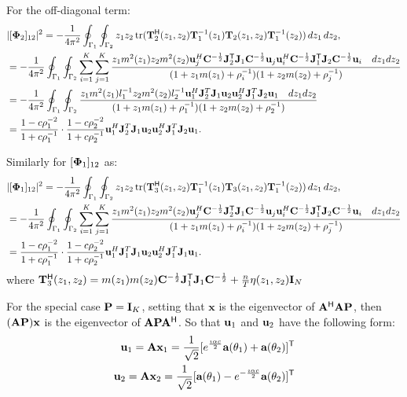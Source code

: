 \documentclass[11pt,a4paper]{article}
\begin{document}
For the off-diagonal term:
\begin{align*}
    &|[{\boldsymbol{\Phi}}_2]_{12}|^2 = -\frac1{4 \pi^2} \oint_{\Gamma_1} \oint_{\Gamma_2} z_1 z_2 \operatorname{tr} ( \mathbf{T}_2^{\sf H}(z_1,z_2) \mathbf{T}_1^{-1}(z_1) \mathbf{T}_2(z_1,z_2) \mathbf{T}_1^{-1}(z_2) )\,dz_1\,dz_2, \\ 
    &= -\frac1{4 \pi^2} \oint_{\Gamma_1} \oint_{\Gamma_2} \sum_{i=1}^K \sum_{j=1}^K \frac{z_1 m^2(z_1) z_2 m^2(z_2) \mathbf{u}_j^H {\mathbf{C}}^{-\frac{1}{2}}{\mathbf{J}}^{\sf T}_2{\mathbf{J}}_1{\mathbf{C}}^{-\frac{1}{2}} \mathbf{u}_j \mathbf{u}_i^H {\mathbf{C}}^{-\frac{1}{2}}{\mathbf{J}}^{\sf T}_1{\mathbf{J}}_2{\mathbf{C}}^{-\frac{1}{2}} \mathbf{u}_i \quad dz_1 dz_2 }{(1+z_1m(z_1)+\rho_i^{-1})(1+z_2m(z_2)+\rho_j^{-1})} \\
    &= -\frac1{4 \pi^2} \oint_{\Gamma_1} \oint_{\Gamma_2} \frac{z_1 m^2(z_1) l_1^{-1} z_2 m^2(z_2) l_2^{-1}  \mathbf{u}_1^H {\mathbf{J}}_2^T {\mathbf{J}}_1 \mathbf{u}_2 \mathbf{u}_2^H {\mathbf{J}}_1^T {\mathbf{J}}_2 \mathbf{u}_1 \quad dz_1 dz_2}{(1+z_1m(z_1)+\rho_1^{-1})(1+z_2m(z_2)+\rho_2^{-1})} \\
    &= \frac{1- c \rho_1^{-2}}{ 1 + c \rho_1^{-1} } \cdot \frac{1- c \rho_2^{-2}}{ 1 + c \rho_2^{-1} }  \mathbf{u}_1^H {\mathbf{J}}_2^T {\mathbf{J}}_1 \mathbf{u}_2 \mathbf{u}_2^H {\mathbf{J}}_1^T {\mathbf{J}}_2 \mathbf{u}_1.
\end{align*}

Similarly for $[{\boldsymbol{\Phi}}_1]_{12}$ as:
\begin{align*}
    &|[{\boldsymbol{\Phi}}_1]_{12}|^2 = -\frac1{4 \pi^2} \oint_{\Gamma_1} \oint_{\Gamma_2} z_1 z_2 \operatorname{tr} ( \mathbf{T}_3^{\sf H}(z_1,z_2) \mathbf{T}_1^{-1}(z_1) \mathbf{T}_3(z_1,z_2) \mathbf{T}_1^{-1}(z_2) )\,dz_1\,dz_2, \\ 
    &= -\frac1{4 \pi^2} \oint_{\Gamma_1} \oint_{\Gamma_2} \sum_{i=1}^K \sum_{j=1}^K \frac{z_1 m^2(z_1) z_2 m^2(z_2) \mathbf{u}_j^H {\mathbf{C}}^{-\frac{1}{2}}{\mathbf{J}}^{\sf T}_2{\mathbf{J}}_1{\mathbf{C}}^{-\frac{1}{2}} \mathbf{u}_j \mathbf{u}_i^H {\mathbf{C}}^{-\frac{1}{2}}{\mathbf{J}}^{\sf T}_1{\mathbf{J}}_2{\mathbf{C}}^{-\frac{1}{2}} \mathbf{u}_i \quad dz_1 dz_2 }{(1+z_1m(z_1)+\rho_i^{-1})(1+z_2m(z_2)+\rho_j^{-1})} \\
    &= \frac{1- c \rho_1^{-2}}{ 1 + c \rho_1^{-1} } \cdot \frac{1- c \rho_2^{-2}}{ 1 + c \rho_2^{-1} }  \mathbf{u}_1^H {\mathbf{J}}_1^T {\mathbf{J}}_1 \mathbf{u}_2 \mathbf{u}_2^H {\mathbf{J}}_1^T {\mathbf{J}}_1 \mathbf{u}_1.
\end{align*}
where $\mathbf{T}_3^{\sf H}(z_1,z_2) = m(z_1)m(z_2){\mathbf{C}}^{-\frac{1}{2}}{\mathbf{J}}^{\sf T}_1{\mathbf{J}}_1{\mathbf{C}}^{-\frac{1}{2}}+\frac{n}{T}\eta(z_1,z_2)\mathbf{I}_N$

For the special case ${\mathbf{P}}=\mathbf{I}_K$, setting that $\textbf{x}$ is the eigenvector of ${\mathbf{A}}^{\sf H} {\mathbf{A}} {\mathbf{P}}$, then $({\mathbf{A}}{\mathbf{P}})\textbf{x}$ is the eigenvector of ${\mathbf{A}} {\mathbf{P}} {\mathbf{A}}^{\sf H}$.
So that $\mathbf{u}_1$ and $\mathbf{u}_2$ have the following form:
\begin{align*}
    \mathbf{u}_1 = {\mathbf{A}} \textbf{x}_1 = \frac{1}{\sqrt{2}} [e^{\frac{\imath\alpha c}{2}}\textbf{a}(\theta_1)+\textbf{a}(\theta_2)]^{\sf T}  \\
    \mathbf{u}_2 = {\mathbf{A}} \textbf{x}_2 = \frac{1}{\sqrt{2}} [\textbf{a}(\theta_1) - e^{-\frac{\imath\alpha c}{2}}\textbf{a}(\theta_2)]^{\sf T} 
\end{align*}
\end{document}
